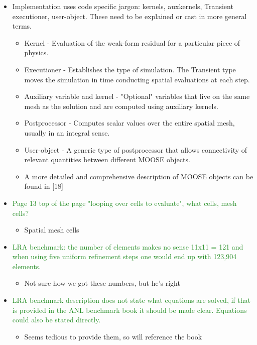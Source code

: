 \documentclass{elsarticle}
\newcommand{\fix}{\textsquare}
\newcommand{\done}{\checkmark}
\newcommand{\easy}[1]{\textcolor{ForestGreen}{#1}}
\newcommand{\medm}[1]{\textcolor{BurntOrange}{#1}}
\begin{document}
\begin{itemize}
\item[\done] \medm{ Implementation uses code specific jargon: kernels, auxkernels, Transient executioner, user-object. These need to be explained or cast in more general terms. }
\begin{itemize}
\item Kernel - Evaluation of the weak-form residual for a particular piece of physics.
\item Executioner - Establishes the type of simulation. The Transient type moves the simulation in time conducting spatial evaluations at each step.
\item Auxiliary variable and kernel - "Optional" variables that live on the same mesh as the solution and are computed using auxiliary kernels. 
\item Postprocessor - Computes scalar values over the entire spatial mesh, usually in an integral sense.
\item User-object - A generic type of postprocessor that allows connectivity of relevant quantities between different MOOSE objects.
\item A more detailed and comprehensive description of MOOSE objects can be found in [18]
\end{itemize}

\item[\done] \easy{ Page 13 top of the page "looping over cells to evaluate", what cells, mesh cells? }
\begin{itemize}
\item Spatial mesh cells
\end{itemize}

\item[\fix] \easy{ LRA benchmark: the number of elements makes no sense 11x11 = 121 and when using five uniform refinement steps one would end up with 123,904 elements. }
\begin{itemize}
\item  Not sure how we got these numbers, but he's right
\end{itemize}

\item[\done] \easy{ LRA benchmark description does not state what equations are solved, if that is provided in the ANL benchmark book it should be made clear. Equations could also be stated directly. }
\begin{itemize}
\item  Seems tedious to provide them, so will reference the book
\end{itemize}


\end{itemize}
\end{document}
